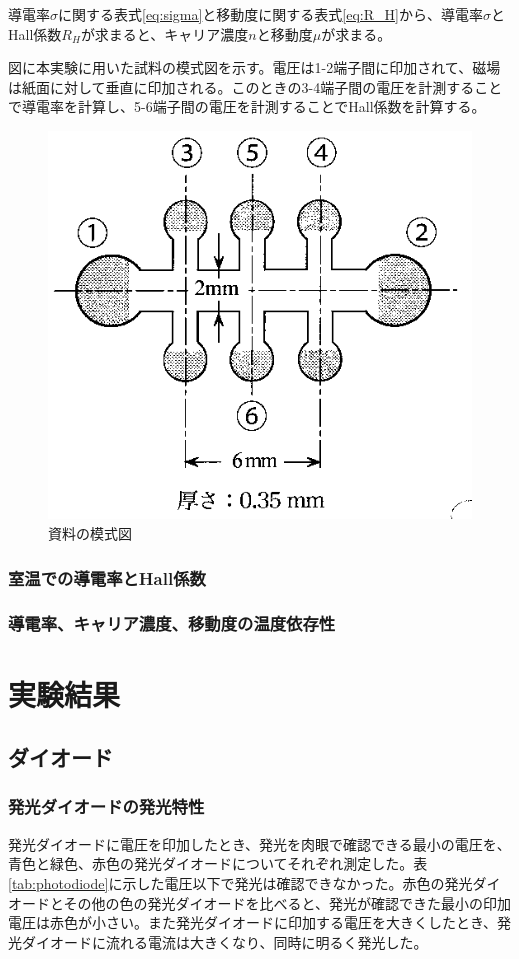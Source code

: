 \documentclass[11pt,a4]{jarticle}
\begin{document}
導電率$\sigma$に関する表式\ref{eq:sigma}と移動度に関する表式\ref{eq:R_H}から、導電率$\sigma$とHall係数$R_H$が求まると、キャリア濃度$n$と移動度$\mu$が求まる。


図に本実験に用いた試料の模式図を示す。電圧は1-2端子間に印加されて、磁場は紙面に対して垂直に印加される。このときの3-4端子間の電圧を計測することで導電率を計算し、5-6端子間の電圧を計測することでHall係数を計算する。
\begin{figure}[!htbp]
   \begin{center}
    \includegraphics[width=0.5\hsize]{./sample.eps}
    \caption{資料の模式図}
     \label{fig:photodiode}
   \end{center}
\end{figure}

\subsubsection{室温での導電率とHall係数}

\subsubsection{導電率、キャリア濃度、移動度の温度依存性}

\section{実験結果}
\subsection{ダイオード}
\subsubsection{発光ダイオードの発光特性}
発光ダイオードに電圧を印加したとき、発光を肉眼で確認できる最小の電圧を、青色と緑色、赤色の発光ダイオードについてそれぞれ測定した。表\ref{tab:photodiode}に示した電圧以下で発光は確認できなかった。赤色の発光ダイオードとその他の色の発光ダイオードを比べると、発光が確認できた最小の印加電圧は赤色が小さい。また発光ダイオードに印加する電圧を大きくしたとき、発光ダイオードに流れる電流は大きくなり、同時に明るく発光した。
\end{document}
